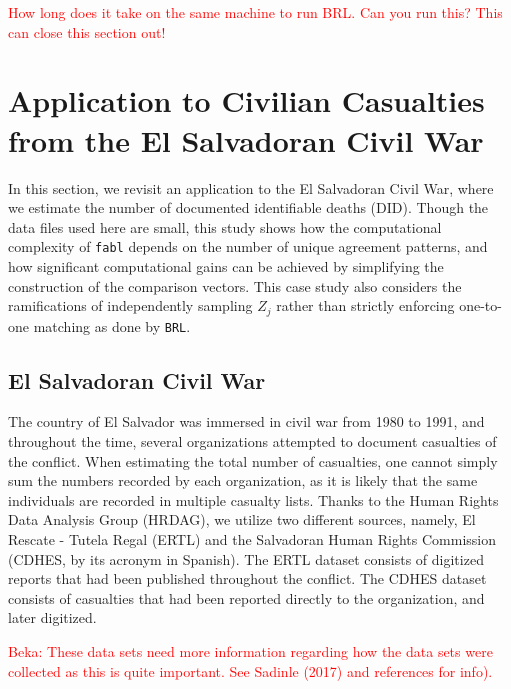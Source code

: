 \documentclass[12pt,letterpaper]{article}
\newcommand{\1}[1]{\mathbb{I}\!\left[#1\right]} %
\begin{document}
 \textcolor{red}{How long does it take on the same machine to run BRL. Can you run this? This can close this section out!}
 
 

\section{Application to Civilian Casualties from the El Salvadoran Civil War}
\label{sex:case-studies}

In this section, we revisit an application to the El Salvadoran Civil War, where we estimate the number of documented identifiable deaths (DID). Though the data files used here are small, this study shows how the computational complexity of \texttt{fabl} depends on the number of unique agreement patterns, and how significant computational gains can be achieved by simplifying the construction of the comparison vectors. This case study also considers the ramifications of 
independently sampling $Z_j$ rather than strictly enforcing one-to-one matching as done by \texttt{BRL}. 


\subsection{El Salvadoran Civil War}
\label{el_salvador}

The country of El Salvador was immersed in civil war from 1980 to 1991,
and throughout the time, several organizations attempted to document
casualties of the conflict. When estimating the total number of
casualties, one cannot simply sum the numbers recorded by each
organization, as it is likely that the same individuals are recorded in
multiple casualty lists. Thanks to the Human Rights Data Analysis Group (HRDAG), we utilize 
two different sources, namely,  El Rescate - Tutela
Regal (ERTL) and the Salvadoran Human Rights Commission (CDHES, by its
acronym in Spanish). The ERTL dataset consists of digitized reports that
had been published throughout the conflict. The CDHES dataset consists
of casualties that had been reported directly to the organization, and
later digitized.

\textcolor{red}{Beka: These data sets need more information regarding how the data sets were collected as this is quite important. See Sadinle (2017) and references for info). }
\end{document}
